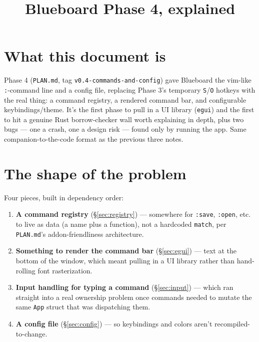 \documentclass[11pt]{article}
\title{Blueboard Phase 4, explained}
\author{}
\date{}
\begin{document}
\maketitle

\section*{What this document is}
Phase 4 (\texttt{PLAN.md}, tag \texttt{v0.4-commands-and-config}) gave Blueboard the
vim-like \texttt{:}-command line and a config file, replacing Phase 3's temporary
\texttt{S}/\texttt{O} hotkeys with the real thing: a command registry, a rendered command
bar, and configurable keybindings/theme. It's the first phase to pull in a UI library
(\texttt{egui}) and the first to hit a genuine Rust borrow-checker wall worth explaining in
depth, plus two bugs — one a crash, one a design risk — found only by running the app.
Same companion-to-the-code format as the previous three notes.

\tableofcontents

\section{The shape of the problem}
Four pieces, built in dependency order:
\begin{enumerate}
  \item \textbf{A command registry} (\S\ref{sec:registry}) — somewhere for \texttt{:save},
    \texttt{:open}, etc. to live as data (a name plus a function), not a hardcoded
    \texttt{match}, per \texttt{PLAN.md}'s addon-friendliness architecture.
  \item \textbf{Something to render the command bar} (\S\ref{sec:egui}) — text at the
    bottom of the window, which meant pulling in a UI library rather than hand-rolling
    font rasterization.
  \item \textbf{Input handling for typing a command} (\S\ref{sec:input}) — which ran
    straight into a real ownership problem once commands needed to mutate the same
    \texttt{App} struct that was dispatching them.
  \item \textbf{A config file} (\S\ref{sec:config}) — so keybindings and colors aren't
    recompiled-to-change.
\end{enumerate}
\end{document}
